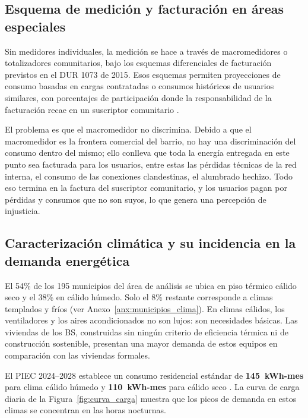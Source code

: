 \subsection{Esquema de medición y facturación en áreas especiales}
\label{subsec:medicion}

Sin medidores individuales, la medición se hace a través de macromedidores o totalizadores comunitarios, bajo los esquemas diferenciales de facturación previstos en el DUR 1073 de 2015. Esos esquemas permiten proyecciones de consumo basadas en cargas contratadas o consumos históricos de usuarios similares, con porcentajes de participación donde la responsabilidad de la facturación recae en un suscriptor comunitario \parencite{DUR1073_2015, CabralesSanjuan2015, MendezFuentes2013, SSPD2020}.

El problema es que el macromedidor no discrimina. Debido a que el macromedidor es la frontera comercial del barrio, no hay una discriminación del consumo dentro del mismo; ello conlleva que toda la energía entregada en este punto sea facturada para los usuarios, entre estas las pérdidas técnicas de la red interna, el consumo de las conexiones clandestinas, el alumbrado hechizo. Todo eso termina en la factura del suscriptor comunitario, y los usuarios pagan por pérdidas y consumos que no son suyos, lo que genera una percepción de injusticia.

\subsection{Caracterización climática y su incidencia en la demanda energética}
\label{subsec:clima_demanda}

El 54\% de los 195 municipios del área de análisis se ubica en piso térmico cálido seco y el 38\% en cálido húmedo. Solo el 8\% restante corresponde a climas templados y fríos (ver Anexo~\ref{anx:municipios_clima}). En climas cálidos, los ventiladores y los aires acondicionados no son lujos: son necesidades básicas. Las viviendas de los BS, construidas sin ningún criterio de eficiencia térmica ni de construcción sostenible, presentan una mayor demanda de estos equipos en comparación con las viviendas formales.

El PIEC 2024--2028 establece un consumo residencial estándar de \textbf{145~kWh-mes} para clima cálido húmedo y \textbf{110~kWh-mes} para cálido seco \parencite{UPME2025}. La curva de carga diaria de la Figura~\ref{fig:curva_carga} muestra que los picos de demanda en estos climas se concentran en las horas nocturnas.

